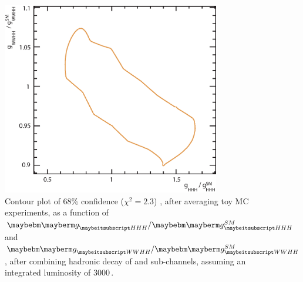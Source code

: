 \begin{figure}[!htbp]
    \includegraphics[width=0.85\textwidth]{doubleHiggs/extraction/new/contourCOmbineAve5}
\caption{Contour plot of 68\% confidence ($\chi^2 = 2.3$) , after averaging toy MC experiments, as a function of $\gHHH/\gHHHSM$ and  $\gWWHH/\gWWHHSM$,  after combining hadronic \WW  decay of \eeToHHbbWW and \eeToHHbbbb sub-channels, assuming an integrated luminosity of  3000\,.}
   \label{fig:doubleHiggsCouplingChi2Countour}
\end{figure} 